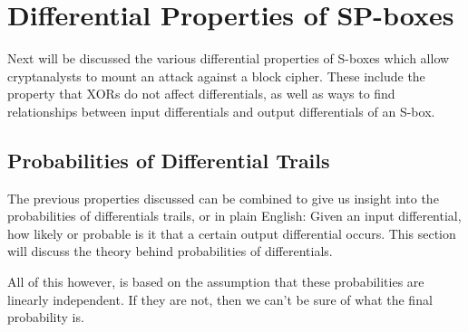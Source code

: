 \section{Differential Properties of SP-boxes}
Next will be discussed the various differential properties of S-boxes which
allow cryptanalysts to mount an attack against a block cipher.  These include
the property that XORs do not affect differentials, as well as ways to find
relationships between input differentials and output differentials of an S-box.

\subsection{Probabilities of Differential Trails}
The previous properties discussed can be combined to give us insight into the
probabilities of differentials trails, or in plain English: Given an input
differential, how likely or probable is it that a certain output differential
occurs. This section will discuss the theory behind probabilities of
differentials. 

All of this however, is based on the assumption that these probabilities are
linearly independent. If they are not, then we can't be sure of what the
final probability is.
